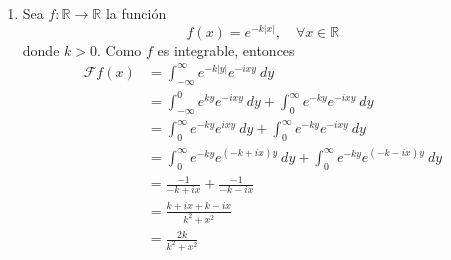 \documentclass[12pt]{report}
\theoremstyle{largebreak}
\newcommand\abs[1]{\ensuremath{\left|#1\right|}}
\newcommand\cf[3]{\ensuremath{#1:#2\rightarrow#3}}
\newcommand{\fou}[1]{\ensuremath{\mathcal{F}#1}}
\begin{document}
\begin{exa}
\begin{enumerate}
            \item Sea $\cf{f}{\mathbb{R}}{\mathbb{R}}$ la función
            \begin{equation*}
                f(x)=e^{-k\abs{x}},\quad\forall x\in\mathbb{R}
            \end{equation*}
            donde $k>0$. Como $f$ es integrable, entonces
            \begin{equation*}
                \begin{split}
                    \fou{f}(x)&=\int_{-\infty}^\infty e^{-k\abs{y}}e^{-ixy}\:dy\\
                    &=\int_{-\infty}^0 e^{ky}e^{-ixy}\:dy+\int_{0}^\infty e^{-ky}e^{-ixy}\:dy\\
                    &=\int_{0}^\infty e^{-ky}e^{ixy}\:dy+\int_{0}^\infty e^{-ky}e^{-ixy}\:dy\\
                    &=\int_{0}^\infty e^{-ky}e^{(-k+ix)y}\:dy+\int_{0}^\infty e^{-ky}e^{(-k-ix)y}\:dy\\
                    &=\frac{-1}{-k+ix}+\frac{-1}{-k-ix}\\
                    &=\frac{k+ix+k-ix}{k^2+x^2}\\
                    &=\frac{2k}{k^2+x^2}\\
                \end{split}
            \end{equation*}
        \end{enumerate}
    \end{exa}
\end{document}
